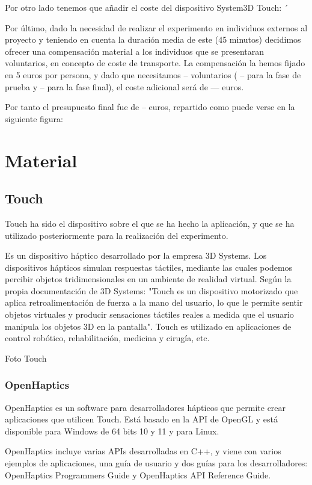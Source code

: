\documentclass[a4paper,11pt, oneside]{book}
\begin{document}
Por otro lado tenemos que añadir el coste del dispositivo System3D Touch: ´ 

Por último, dado la necesidad de realizar el experimento en individuos externos al proyecto y teniendo en cuenta la duración media de este (45 minutos) decidimos ofrecer una compensación material a los individuos que se presentaran voluntarios, en concepto de coste de transporte. La compensación la hemos fijado en 5 euros por persona, y dado que necesitamos -- voluntarios ( -- para la fase de prueba y -- para la fase final), el coste adicional será de --- euros.

Por tanto el presupuesto final fue de -- euros, repartido como puede verse en la siguiente figura:


\chapter{Material}

\section{Touch}

Touch ha sido el dispositivo sobre el que se ha hecho la aplicación, y que se ha utilizado posteriormente para la realización del experimento.

Es un dispositivo háptico desarrollado por la empresa 3D Systems. Los dispositivos hápticos simulan respuestas táctiles, mediante las cuales podemos percibir objetos tridimensionales en un ambiente de realidad virtual.
Según la propia documentación de 3D Systems: "Touch es un dispositivo motorizado que aplica retroalimentación de fuerza a la mano del usuario, lo que le permite sentir objetos virtuales y producir sensaciones táctiles reales a medida que el usuario manipula los objetos 3D en la pantalla". Touch es utilizado en aplicaciones de control robótico, rehabilitación, medicina y cirugía, etc.

Foto Touch

\subsection{OpenHaptics}

OpenHaptics es un software para desarrolladores hápticos que permite crear aplicaciones que utilicen Touch. Está basado en la API de OpenGL y está disponible para Windows de 64 bits 10 y 11 y para Linux. 

OpenHaptics incluye varias APIs desarrolladas en C++, y viene con varios ejemplos de aplicaciones, una guía de usuario y dos guías para los desarrolladores: OpenHaptics Programmers Guide y OpenHaptics API Reference Guide. 
\end{document}
